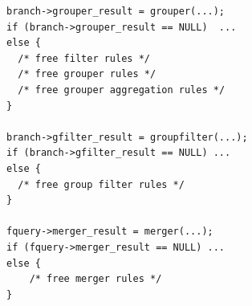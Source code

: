 \begin{lstlisting}
branch->grouper_result = grouper(...);
if (branch->grouper_result == NULL)  ...
else {
  /* free filter rules */
  /* free grouper rules */
  /* free grouper aggregation rules */
}

branch->gfilter_result = groupfilter(...);
if (branch->gfilter_result == NULL) ...
else {
  /* free group filter rules */
}

fquery->merger_result = merger(...);
if (fquery->merger_result == NULL) ...
else {
    /* free merger rules */
}
\end{lstlisting}
